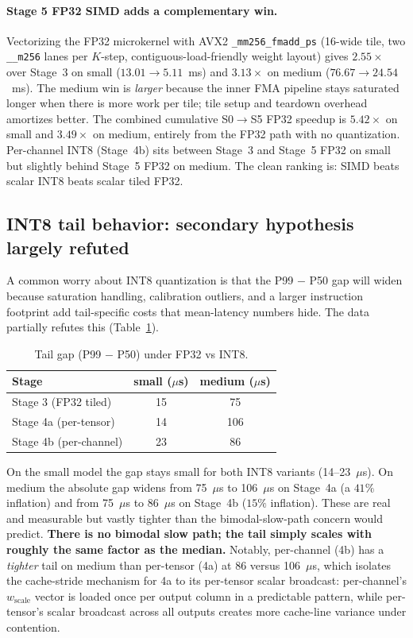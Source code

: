 \documentclass{article}
\begin{document}
\paragraph{Stage 5 FP32 SIMD adds a complementary win.}
Vectorizing the FP32 microkernel with AVX2 \texttt{\_mm256\_fmadd\_ps} (16-wide tile, two \texttt{\_\_m256} lanes per $K$-step, contiguous-load-friendly weight layout) gives $2.55\times$ over Stage~3 on small ($13.01 \to 5.11$~ms) and $\mathbf{3.13\times}$ on medium ($76.67 \to 24.54$~ms).
The medium win is \emph{larger} because the inner FMA pipeline stays saturated longer when there is more work per tile; tile setup and teardown overhead amortizes better.
The combined cumulative S0$\to$S5 FP32 speedup is $\mathbf{5.42\times}$ on small and $\mathbf{3.49\times}$ on medium, entirely from the FP32 path with no quantization.
Per-channel INT8 (Stage~4b) sits between Stage~3 and Stage~5 FP32 on small but slightly behind Stage~5 FP32 on medium.
The clean ranking is: SIMD beats scalar INT8 beats scalar tiled FP32.

\subsection{INT8 tail behavior: secondary hypothesis largely refuted}
\label{sec:tail}

A common worry about INT8 quantization is that the P99 $-$ P50 gap will widen because saturation handling, calibration outliers, and a larger instruction footprint add tail-specific costs that mean-latency numbers hide.
The data partially refutes this (Table~\ref{tab:gap}).

\begin{table}[t]
\centering
\caption{Tail gap (P99 $-$ P50) under FP32 vs INT8.}
\label{tab:gap}
\small
\begin{tabular}{lcc}
\toprule
Stage & small ($\mu$s) & medium ($\mu$s) \\
\midrule
Stage 3 (FP32 tiled)   & 15 & 75 \\
Stage 4a (per-tensor)  & 14 & 106 \\
Stage 4b (per-channel) & 23 & 86 \\
\bottomrule
\end{tabular}
\end{table}

On the small model the gap stays small for both INT8 variants (14--23~$\mu$s).
On medium the absolute gap widens from 75~$\mu$s to 106~$\mu$s on Stage~4a (a $41\%$ inflation) and from 75~$\mu$s to 86~$\mu$s on Stage~4b ($15\%$ inflation).
These are real and measurable but vastly tighter than the bimodal-slow-path concern would predict.
\textbf{There is no bimodal slow path; the tail simply scales with roughly the same factor as the median.}
Notably, per-channel (4b) has a \emph{tighter} tail on medium than per-tensor (4a) at 86 versus 106~$\mu$s, which isolates the cache-stride mechanism for 4a to its per-tensor scalar broadcast: per-channel's $w_\text{scale}$ vector is loaded once per output column in a predictable pattern, while per-tensor's scalar broadcast across all outputs creates more cache-line variance under contention.
\end{document}
